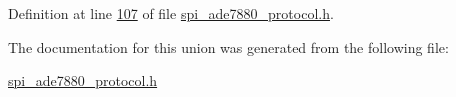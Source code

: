 Definition at line \hyperlink{a00041_source_l00107}{107} of file \hyperlink{a00041_source}{spi\-\_\-ade7880\-\_\-protocol.\-h}.



The documentation for this union was generated from the following file\-:\begin{DoxyCompactItemize}
\item 
\hyperlink{a00041}{spi\-\_\-ade7880\-\_\-protocol.\-h}\end{DoxyCompactItemize}
